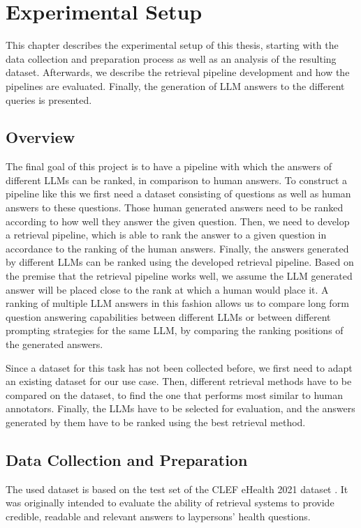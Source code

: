 \chapter{Experimental Setup}\label{experimental-setup}
This chapter describes the experimental setup of this thesis, starting with the data collection and preparation process as well as an analysis of the resulting dataset.
Afterwards, we describe the retrieval pipeline development and how the pipelines are evaluated.
Finally, the generation of LLM answers to the different queries is presented.

\section{Overview}\label{sec:overview}
The final goal of this project is to have a pipeline with which the answers of different LLMs can be ranked, in comparison to human answers.
To construct a pipeline like this we first need a dataset consisting of questions as well as human answers to these questions.
Those human generated answers need to be ranked according to how well they answer the given question.
Then, we need to develop a retrieval pipeline, which is able to rank the answer to a given question in accordance to the ranking of the human answers.
Finally, the answers generated by different LLMs can be ranked using the developed retrieval pipeline.
Based on the premise that the retrieval pipeline works well, we assume the LLM generated answer will be placed close to the rank at which a human would place it.
A ranking of multiple LLM answers in this fashion allows us to compare long form question answering capabilities between different LLMs or between different prompting strategies for the same LLM, by comparing the ranking positions of the generated answers.

Since a dataset for this task has not been collected before, we first need to adapt an existing dataset for our use case.
Then, different retrieval methods have to be compared on the dataset, to find the one that performs most similar to human annotators.
Finally, the LLMs have to be selected for evaluation, and the answers generated by them have to be ranked using the best retrieval method.

\section{Data Collection and Preparation}\label{sec:dataset}
The used dataset is based on the test set of the CLEF eHealth 2021 dataset \cite{goeuriot:2021:Consumer}.
It was originally intended to evaluate the ability of retrieval systems to provide credible, readable and relevant answers to laypersons' health questions.

